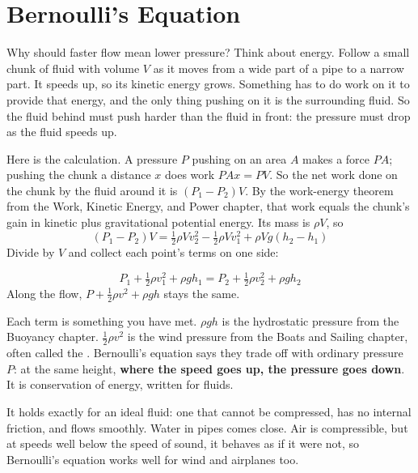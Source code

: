 \section{Bernoulli's Equation}
Why should faster flow mean lower pressure? Think about energy. Follow a small chunk of fluid with
volume $V$ as it moves from a wide part of a pipe to a narrow part. It speeds up, so its kinetic
energy grows. Something has to do work on it to provide that energy, and the only thing pushing on
it is the surrounding fluid. So the fluid behind must push harder than the fluid in front: the pressure
must drop as the fluid speeds up.

Here is the calculation. A pressure $P$ pushing on an area $A$ makes a force $PA$; pushing the chunk a
distance $x$ does work $PAx = PV$. So the net work done on the chunk by the fluid around it is
$(P_1 - P_2)V$. By the work-energy theorem from the Work, Kinetic Energy, and Power chapter, that work equals the chunk's gain in
kinetic plus gravitational potential energy. Its mass is $\rho V$, so
$$(P_1 - P_2)V = \tfrac{1}{2}\rho V v_2^2 - \tfrac{1}{2}\rho V v_1^2 + \rho Vg(h_2 - h_1)$$
Divide by $V$ and collect each point's terms on one side:

\begin{mdframed}[style = important, frametitle = {Bernoulli's Equation}]
$$P_1 + \tfrac{1}{2}\rho v_1^2 + \rho gh_1 = P_2 + \tfrac{1}{2}\rho v_2^2 + \rho gh_2$$
Along the flow, $P + \frac{1}{2}\rho v^2 + \rho gh$ stays the same.
\end{mdframed}

Each term is something you have met. $\rho gh$ is the hydrostatic pressure from the Buoyancy chapter.
$\frac{1}{2}\rho v^2$ is the wind pressure from the Boats and Sailing chapter, often called the
. Bernoulli's equation says they trade off with ordinary pressure $P$: at the
same height, \textbf{where the speed goes up, the pressure goes down}. It is conservation of energy, written
for fluids.

It holds exactly for an ideal fluid: one that cannot be compressed, has no internal friction, and flows
smoothly. Water in pipes comes close. Air is compressible, but at speeds well below the speed of sound,
it behaves as if it were not, so Bernoulli's equation works well for wind and airplanes too.


